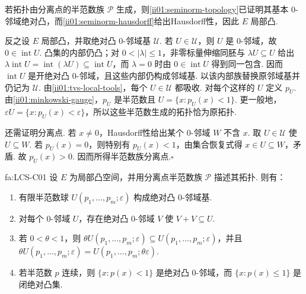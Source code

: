 \begin{FAProof}
若拓扑由分离点的半范数族 \(\displaystyle \mathcal P\) 生成，则\autoref{ii01:seminorm-topology}已证明其基本 \(\displaystyle0\)-邻域绝对凸，而\autoref{ii01:seminorm-hausdorff}给出Hausdorff性，因此 \(\displaystyle E\) 局部凸.

反之设 \(\displaystyle E\) 局部凸，并取绝对凸 \(\displaystyle0\)-邻域基 \(\displaystyle \mathcal U\). 若 \(\displaystyle U\in\mathcal U\)，则 \(\displaystyle U\) 是 \(\displaystyle0\)-邻域，故 \(\displaystyle0\in\operatorname{int}U\). 凸集的内部仍凸；对 \(\displaystyle0<|\lambda|\leqslant1\)，非零标量伸缩同胚与 \(\displaystyle \lambda U\subseteq U\) 给出 \(\displaystyle \lambda\operatorname{int}U=\operatorname{int}(\lambda U)\subseteq\operatorname{int}U\)，而 \(\displaystyle \lambda=0\) 时由 \(\displaystyle0\in\operatorname{int}U\) 得到同一包含. 因而 \(\displaystyle \operatorname{int}U\) 是开绝对凸 \(\displaystyle0\)-邻域，且这些内部仍构成邻域基. 以该内部族替换原邻域基并仍记为 \(\displaystyle \mathcal U\). 由\autoref{ii01:tvs-local-tools}，每个 \(\displaystyle U\in\mathcal U\) 都吸收. 对每个这样的 \(\displaystyle U\) 定义 \(\displaystyle p_U\). 由\autoref{ii01:minkowski-gauge}，\(\displaystyle p_U\) 是半范数且 \(\displaystyle U=\{x:p_U(x)<1\}\). 更一般地，\(\displaystyle \varepsilon U=\{x:p_U(x)<\varepsilon\}\)，所以这些半范数生成的拓扑恰为原拓扑.

还需证明分离点. 若 \(\displaystyle x\neq0\)，Hausdorff性给出某个 \(\displaystyle0\)-邻域 \(\displaystyle W\) 不含 \(\displaystyle x\). 取 \(\displaystyle U\in\mathcal U\) 使 \(\displaystyle U\subseteq W\). 若 \(\displaystyle p_U(x)=0\)，则特别有 \(\displaystyle p_U(x)<1\)，由集合恢复式得 \(\displaystyle x\in U\subseteq W\)，矛盾. 故 \(\displaystyle p_U(x)>0\). 因而所得半范数族分离点.\hfill\(\square\)
\end{FAProof}

\begin{FAProposition}[C][局部凸邻域工具]{fa:LCS-C01}
设 \(\displaystyle E\) 为局部凸空间，并用分离点半范数族 \(\displaystyle \mathcal P\) 描述其拓扑. 则有：
\begin{enumerate}[label=(\roman*)]
\item 有限半范数球 \(\displaystyle U(p_1,\dots,p_m;\varepsilon)\) 构成绝对凸 \(\displaystyle0\)-邻域基.
\item 对每个 \(\displaystyle0\)-邻域 \(\displaystyle U\)，存在绝对凸 \(\displaystyle0\)-邻域 \(\displaystyle V\) 使 \(\displaystyle V+V\subseteq U\).
\item 若 \(\displaystyle0<\theta<1\)，则 \(\displaystyle \theta U(p_1,\dots,p_m;\varepsilon)\subseteq U(p_1,\dots,p_m;\varepsilon)\)，并且 \(\displaystyle \theta U(p_1,\dots,p_m;\varepsilon)=U(p_1,\dots,p_m;\theta\varepsilon)\).
\item 若半范数 \(\displaystyle p\) 连续，则 \(\displaystyle \{x:p(x)<1\}\) 是绝对凸 \(\displaystyle0\)-邻域，而 \(\displaystyle \{x:p(x)\leqslant1\}\) 是闭绝对凸集.
\end{enumerate}
\end{FAProposition}

